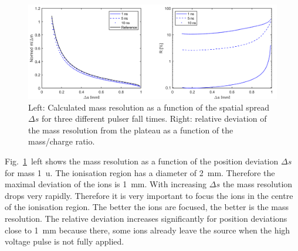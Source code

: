 	\begin{figure}[h!] %
		\centering
		\includegraphics[width=\textwidth]{Bilder/PulseSimPosition.png}
		\caption{Left: Calculated mass resolution as a function of the spatial spread $\Delta s$ for three different pulser fall times. Right: relative deviation of the mass resolution from the plateau as a function of the mass/charge ratio.}
		\label{fig:SimtfallPos}
	\end{figure}
	Fig.~\ref{fig:SimtfallPos}~left shows the mass resolution as a function of the position deviation $\Delta s$ for mass 1~u. The ionisation region has a diameter of 2~mm. Therefore the maximal deviation of the ions is 1~mm. With increasing $\Delta s$ the mass resolution drops very rapidly. Therefore it is very important to focus the ions in the centre of the ionisation region. The better the ions are focused, the better is the mass resolution. The relative deviation increases significantly for position deviations close to 1~mm because there, some ions already leave the source when the high voltage pulse is not fully applied.\\



